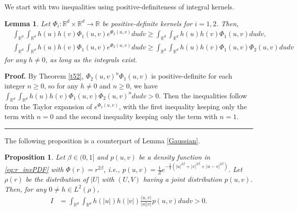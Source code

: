 \documentclass[]{elsarticle}
\def\R{\mathbb{R}}
\def\E{\mathbb{E}}
\newcommand{\mbf}[1]{\boldsymbol{#1}}
\newcommand{\innerp}[2]{\langle #1,#2 \rangle}
\newcommand{\br}{\mbf{r}}
\newtheorem{lemma}[theorem]{Lemma}
\newtheorem{proposition}[theorem]{Proposition}
\newenvironment{proof}[1][Proof]{\noindent\textbf{#1.} }{\ \rule{0.5em}{0.5em}}
\numberwithin{equation}{section}
\numberwithin{theorem}{section}
\begin{document}
 We start with two inequalities using positive-definiteness of integral kernels. 
 \begin{lemma}\label{lemma_exp_bound}
 Let $\Phi_i:\R^d\times \R^d\to \R$ be positive-definite kernels for $i=1,2$.  Then, 
 \begin{align*}
 &  \int_{\R^d} \int_{\R^d} h(u)h(v) \Phi_1(u,v) e^{\Phi_2(u,v)} dudv  
 \geq  \int_{\R^d} \int_{\R^d} h(u)h(v) \Phi_1(u,v)  dudv, \\
&  \int_{\R^d} \int_{\R^d} h(u)h(v) \Phi_1(u,v) e^{\Phi_2(u,v)} dudv  
 \geq  \int_{\R^d} \int_{\R^d} h(u)h(v) \Phi_1(u,v) \Phi_2(u,v)  dudv
 \end{align*}
for any $h\neq 0$, as long as the integrals exist. 
 \end{lemma}
 \begin{proof}
 By Theorem \ref{t52}, $\Phi_2(u,v)^n \Phi_1(u,v) $ is positive-definite for each integer $n\geq 0$, so for any $h\neq 0$ and $n\geq 0$, we have $ \int_{\R^d} \int_{\R^d} h(u)h(v) \Phi_1(u,v) \Phi_2(u,v)^ndudv >0$. Then the inequalities follow from the Taylor expansion of  $e^{\Phi_2(u,v)}$, with the first inequality keeping only the term with $n=0$ and the second inequality keeping only the term with $n=1$. 
  \end{proof}

 

The following proposition is a counterpart of Lemma \ref{Gaussian}. 
\begin{proposition}\label{prop_powerKernel}
Let $\beta\in (0,1]$ and  $p(u,v)$ be a density function in \eqref{eq:r_invPDF} with $\Phi(r)= r^{2\beta}$, i.e., $p(u,v) = \frac{1}{Z} e^{-\frac{2}{3} (|u|^{2\beta}+ |v|^{2\beta}+|u-v|^{2\beta})}$. Let  $\rho(r)$ be the distribution of $|U|$ with $(U,V)$ having a joint distribution $p(u,v)$. Then, for any $0\neq h\in L^2(\rho)$, 
 \begin{align*}
I %
&=\int_{\R^d}\int_{\R^d}h(|u|)h(|v|)\frac{\langle u,v \rangle}{|u||v|}p(u,v)dudv >0.
\end{align*}

\end{proposition}
\end{document}
